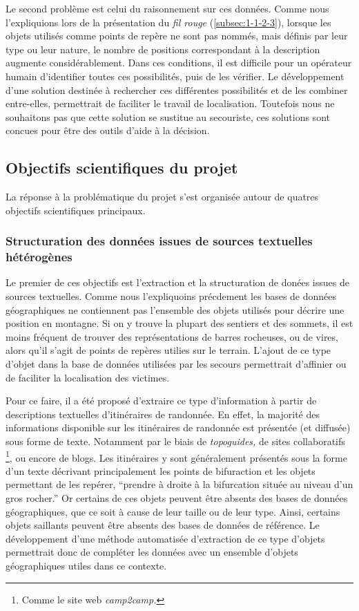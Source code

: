 Le second problème est celui du raisonnement sur ces données. Comme
nous l'expliquions lors de la présentation du \emph{fil rouge}
(\ref{subsec:1-1-2-3}), lorsque les objets utilisés comme points de
repère ne sont pas nommés, mais définis par leur type ou leur nature,
le nombre de positions correspondant à la description augmente
considérablement. Dans ces conditions, il est difficile pour un
opérateur humain d'identifier toutes ces possibilités, puis de les
vérifier. Le développement d'une solution destinée à rechercher ces
différentes possibilités et de les combiner entre-elles, permettrait
de faciliter le travail de localisation. Toutefois nous ne souhaitons
pas que cette solution se sustitue au secouriste, ces solutions sont
concues pour être des outils d'aide à la décision.

\subsection{Objectifs scientifiques du projet}
\label{subsec:1-2-3}

La réponse à la problématique du projet s'est organisée autour de
quatres objectifs scientifiques principaux.

\subsubsection{Structuration des données issues de sources textuelles
  hétérogènes}

Le premier de ces objectifs est l'extraction et la structuration de
donées issues de sources textuelles. Comme nous l'expliquoins
précdement les bases de données géographiques ne contiennent pas
l'ensemble des objets utilisés pour décrire une position en
montagne. Si on y trouve la plupart des sentiers et des sommets, il
est moins fréquent de trouver des représentations de barres rocheuses,
ou de vires, alors qu'il s'agit de points de repères utilies sur le
terrain. L'ajout de ce type d'objet dans la base de données utilisées
par les secours permettrait d'affinier ou de faciliter la localisation
des victimes.

Pour ce faire, il a été proposé d'extraire ce type d'information à
partir de descriptions textuelles d'itinéraires de randonnée. En
effet, la majorité des informations disponible sur les itinéraires de
randonnée est présentée (et diffusée) sous forme de texte. Notamment
par le biais de \emph{topoguides,} de sites collaboratifs
\footnote{Comme le site web \emph{camp2camp.}}, ou encore de
blogs. Les itinéraires y sont généralement présentés sous la forme
d'un texte décrivant principalement les points de bifuraction et les
objets permettant de les repérer, \eg \enquote{prendre à droite à la
  bifurcation située au niveau d'un gros rocher.} Or certains de ces
objets peuvent être absents des bases de données géographiques, que ce
soit à cause de leur taille ou de leur type. Ainsi, certains objets
saillants peuvent être absents des bases de données de référence. Le
développement d'une méthode automatisée d'extraction de ce type
d'objets permettrait donc de compléter les données avec un ensemble
d'objets géographiques utiles dans ce contexte.

